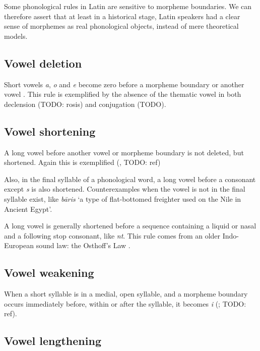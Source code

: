 \documentclass[a4paper, oneside, 12pt]{report}
\newcommand*{\citesec}[1]{\S~{#1}}
\newcommand*{\citepage}[1]{p.~{#1}}
\newcommand{\form}[1]{\emph{#1}}
\newcommand{\translate}[1]{`#1'}
\begin{document}
Some phonological rules in Latin are sensitive to morpheme boundaries.
We can therefore assert that at least in a historical stage, 
Latin speakers had a clear sense of morphemes 
as real phonological objects,
instead of mere theoretical models.

\subsection{Vowel deletion}\label{sec:phonology.rule.deletion}

Short vowels \form{a}, \form{o} and \form{e} 
become zero before a morpheme boundary or another vowel
\citep[\citesec{8.3}]{oniga2014latin}.
This rule is exemplified by the absence 
of the thematic vowel in both declension (TODO: rosis)
and conjugation (TODO).

\subsection{Vowel shortening}\label{sec:phonology.rule.shortening}

A long vowel before another vowel or morpheme boundary 
is not deleted, but shortened.
Again this is exemplified (, TODO: ref)

Also, in the final syllable of a phonological word,
a long vowel before a consonant except \form{s} is also shortened.
Counterexamples when the vowel is not in the final syllable exist,
like \form{b\={a}ris} \translate{a type of flat-bottomed freighter used on the Nile in Ancient Egypt}.

A long vowel is generally shortened before a sequence 
containing a liquid or nasal and a following stop consonant,
like \form{nt}.
This rule comes from an older Indo-European sound law: 
the Osthoff's Law
\citep[\citepage{55}]{oniga2014latin}.

\subsection{Vowel weakening}

When a short syllable is in a medial, open syllable,
and a morpheme boundary occurs immediately before, within or after the syllable,
it becomes \form{i} 
(\citealt[\citepage{55}]{oniga2014latin}; TODO: ref).

\subsection{Vowel lengthening}
\end{document}
